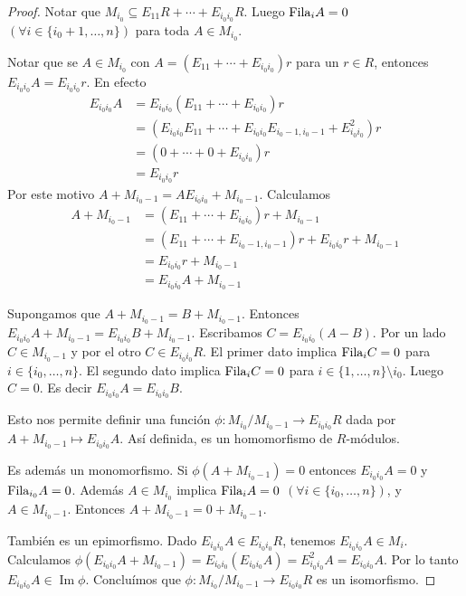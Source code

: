\documentclass{report}
\newcommand{\Fila}{\textnormal{Fila}}
\DeclareMathOperator{\image}{\text{Im}}
\begin{document}
  \begin{proof}
    Notar que \(M_{i_0} \subseteq E_{1 1} R + \cdots + E_{i_0 i_0} R\).
    Luego \(\Fila_i A = 0\) \((\forall i \in \{i_0 + 1, \dots, n\})\) para toda \(A \in M_{i_0}\).

    Notar que se \(A \in M_{i_0}\) con \(A = (E_{1 1} + \cdots + E_{i_0 i_0}) r\) para un \(r \in R\), entonces \(E_{i_0 i_0} A = E_{i_0 i_0} r\).
    En efecto
    \begin{align}
      E_{i_0 i_0} A
      &=
      E_{i_0 i_0} (E_{1 1} + \cdots + E_{i_0 i_0}) r
      \\
      &=
      (E_{i_0 i_0} E_{1 1} + \cdots + E_{i_0 i_0} E_{i_0 - 1, i_0 - 1} + E_{i_0 i_0}^2) r
      \\
      &=
      (0 + \cdots + 0 + E_{i_0 i_0}) r
      \\
      &=
      E_{i_0 i_0} r
    \end{align}
    Por este motivo \(A + M_{i_0 - 1} = A E_{i_0 i_0} + M_{i_0 - 1}\).
    Calculamos
    \begin{align}
      A + M_{i_0 - 1}
      &=
      (E_{1 1} + \cdots + E_{i_0 i_0}) r + M_{i_0 - 1}
      \\
      &=
      (E_{1 1} + \cdots + E_{i_0 - 1, i_0 - 1}) r + E_{i_0 i_0} r + M_{i_0 - 1}
      \\
      &=
      E_{i_0 i_0} r + M_{i_0 - 1}
      \\
      &=
      E_{i_0 i_0} A + M_{i_0 - 1}
    \end{align}

    Supongamos que \(A + M_{i_0 - 1} = B + M_{i_0 -1}\).
    Entonces \(E_{i_0 i_0} A + M_{i_0 - 1} = E_{i_0 i_0} B + M_{i_0 - 1}\).
    Escribamos \(C = E_{i_0 i_0} (A - B)\).
    Por un lado \(C \in M_{i_0 - 1}\) y por el otro \(C \in E_{i_0 i_0} R\).
    El primer dato implica \(\Fila_i C = 0\) para \(i \in \{i_0, \dots, n\}\).
    El segundo dato implica \(\Fila_i C = 0\) para \(i \in \{1, \dots, n\} \setminus i_0\).
    Luego \(C = 0\).
    Es decir \(E_{i_0 i_0} A = E_{i_0 i_0} B\).

    Esto nos permite definir una función \(\phi : M_{i_0} / M_{i_0 - 1} \rightarrow E_{i_0 i_0} R\) dada por \(A + M_{i_0 - 1} \mapsto E_{i_0 i_0} A\).
    Así definida, es un homomorfismo de \(R\)-módulos.

    Es además un monomorfismo.
    Si \(\phi(A + M_{i_0 - 1}) = 0\) entonces \(E_{i_0 i_0} A = 0\) y \(\Fila_{i_0} A = 0\).
    Además \(A \in M_{i_0}\) implica \(\Fila_i A = 0\) \((\forall i \in \{i_0, \dots, n\})\), y \(A \in M_{i_0 - 1}\).
    Entonces \(A + M_{i_0 - 1} = 0 + M_{i_0 - 1}\).

    También es un epimorfismo.
    Dado \(E_{i_0 i_0} A \in E_{i_0 i_0} R\), tenemos \(E_{i_0 i_0} A \in M_i\).
    Calculamos \(\phi(E_{i_0 i_0} A + M_{i_0 - 1}) = E_{i_0 i_0} (E_{i_0 i_0} A) = E_{i_0 i_0}^2 A = E_{i_0 i_0} A\).
    Por lo tanto \(E_{i_0 i_0} A \in \image \phi\).
    Concluímos que \(\phi : M_{i_0} / M_{i_0 - 1} \rightarrow E_{i_0 i_0} R\) es un isomorfismo.
  \end{proof}
\end{document}
